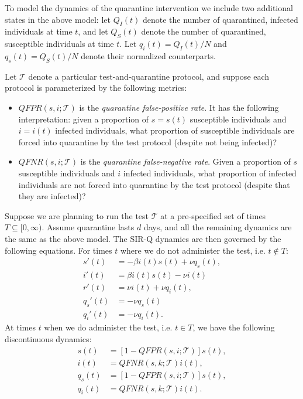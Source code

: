\documentclass[11pt]{article}
\begin{document}
To model the dynamics of the quarantine intervention we include
two additional states in the above model: let $Q_I(t)$ denote the number of quarantined, infected
individuals at time $t$, and let $Q_S(t)$ denote the number of quarantined, susceptible individuals
at time $t$.  Let $q_i(t)=Q_I(t)/N$ and $q_s(t)=Q_S(t)/N$ denote their normalized counterparts.

Let $\mathcal{T}$ denote a particular test-and-quarantine protocol, and suppose
each protocol is parameterized by the following metrics:
\begin{itemize}
    \item $QFPR(s,i;\mathcal{T})$ is the \emph{quarantine false-positive rate}.  It has the following interpretation:
        given a proportion of $s=s(t)$ susceptible individuals and $i=i(t)$ infected individuals, what proportion of
        susceptible individuals are forced into quarantine by the test protocol (despite not being infected)?
    \item $QFNR(s,i;\mathcal{T})$ is the \emph{quarantine false-negative rate}.  Given a proportion of
        $s$ susceptible individuals and $i$ infected individuals, what proportion of infected individuals are
        not forced into quarantine by the test protocol (despite that they are infected)?
\end{itemize}


Suppose we are planning to run the test $\mathcal{T}$ at a pre-specified set of times $T\subseteq [0,\infty)$. 
Assume quarantine lasts $d$ days, and all the remaining dynamics are the same as the above model.
The SIR-Q dynamics are then governed by the following equations.  For times $t$ where we do not administer the
test, i.e. $t\notin T$:
\begin{align}
    s'(t) &= -\beta i(t) s(t) + \nu q_s(t),\\
    i'(t) &= \beta i(t) s(t) - \nu i(t) \\
    r'(t) &= \nu i(t) + \nu q_i(t), \\
    q_s'(t) &= -\nu q_s(t) \\
    q_i'(t) &= -\nu q_i(t) .
\end{align}
At times $t$ when we do administer the test, i.e. $t\in T$, we have the following discontinuous dynamics:
\begin{align}
    s(t) &= \left[1-QFPR(s,i;\mathcal{T})\right]s(t),\\
    i(t) &= QFNR(s,k;\mathcal{T}) i(t),\\
    q_s(t) &= \left[1-QFPR(s,i;\mathcal{T})\right]s(t),\\
    q_i(t) &= QFNR(s,k;\mathcal{T})i(t).
\end{align}
\end{document}
